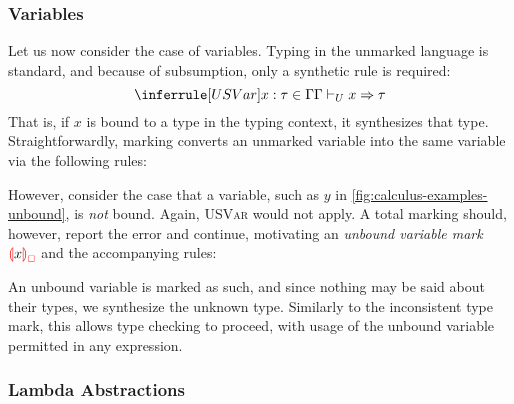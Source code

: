 \subsubsection{Variables}
\label{sec:calculus-variables}

Let us now consider the case of variables. Typing in the unmarked language is standard, and because
of subsumption, only a synthetic rule is required:
\[%
  \judgment{
    \inCtx{\ctx}{x}{\TMV}
  }{
    \ctxSynTypeU{\ctx}{x}{\TMV}
  }{USVar}
\]%
That is, if $x$ is bound to a type in the typing context, it synthesizes that type.
Straightforwardly, marking converts an unmarked variable into the same variable via the following
rules:
%
\begin{mathpar}

\end{mathpar}

However, consider the case that a variable, such as $y$ in \cref{fig:calculus-examples-unbound}, is \emph{not}
bound. Again, \textsc{USVar} would not apply. A total marking should, however, report the error and
continue, motivating an \emph{unbound variable mark} $\ECUnbound{x}$ and the accompanying rules:
%
\begin{mathpar}

\end{mathpar}
%
An unbound variable is marked as such, and since nothing may be said about their types, we
synthesize the unknown type. Similarly to the inconsistent type mark, this allows type checking to
proceed, with usage of the unbound variable permitted in any expression.

\subsubsection{Lambda Abstractions}
\label{sec:calculus-lambda-abstractions}

